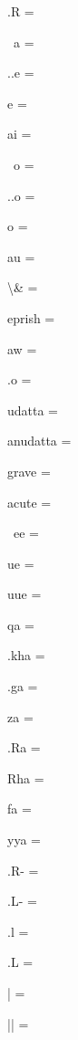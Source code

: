 \documentclass{article}
\begin{document}
\begin{multicols}{6}
\noindent .R = {\fdeva {}}\par
\noindent ~a = {\fdeva {}}\par
\noindent ..e = {\fdeva {}}\par
\noindent e = {\fdeva {}}\par
\noindent ai = {\fdeva {}}\par
\noindent ~o = {\fdeva {}}\par
\noindent ..o = {\fdeva {}}\par
\noindent o = {\fdeva {}}\par
\noindent au = {\fdeva {}}\par
\noindent \textbackslash\& = {\fdeva \vh{\&}}\par
\noindent eprish = {\fdeva {}}\par
\noindent aw = {\fdeva {}}\par
\noindent .o = {\fdeva {}}\par
\noindent udatta = {\fdeva {}}\par
\noindent anudatta = {\fdeva {}}\par
\noindent grave = {\fdeva {}}\par
\noindent acute = {\fdeva {}}\par
\noindent ~ee = {\fdeva {}}\par
\noindent ue = {\fdeva {}}\par
\noindent uue = {\fdeva {}}\par
\noindent qa = {\fdeva {}}\par
\noindent .kha = {\fdeva {}}\par
\noindent .ga = {\fdeva {}}\par
\noindent za = {\fdeva {}}\par
\noindent .Ra = {\fdeva {}}\par
\noindent Rha = {\fdeva {}}\par
\noindent fa = {\fdeva {}}\par
\noindent yya = {\fdeva {}}\par
\noindent .R- = {\fdeva {}}\par
\noindent .L- = {\fdeva {}}\par
\noindent .l = {\fdeva {}}\par
\noindent .L = {\fdeva {}}\par
\noindent | = {\fdeva \vh{|}}\par
\noindent || = {\fdeva \vh{||}}\par

\end{multicols}
\end{document}
